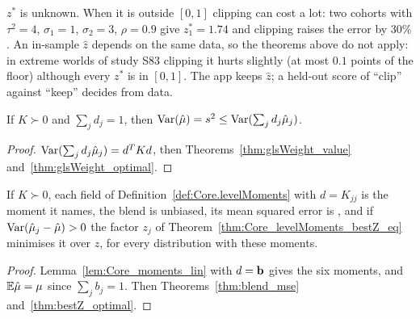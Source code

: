\begin{remark}
  $z^*$ is unknown. When it is outside $[0, 1]$ clipping can cost a lot: two cohorts with $\tau^2 = 4$,
  $\sigma_1 = 1$, $\sigma_2 = 3$, $\rho = 0.9$ give $z_1^* = 1.74$ and clipping raises the error by $30\%$. An in-sample
  $\hat z$ depends on the same data, so the theorems above do not apply: in extreme worlds of study S83 clipping it
  hurts slightly (at most $0.1$ points of the floor) although every $z^*$ is in $[0, 1]$. The app keeps $\hat z$; a
  held-out score of ``clip'' against ``keep'' decides from data.
\end{remark}

\begin{theorem}\label{thm:Core_weights_true}
  \leanok
  If $K \succ 0$ and $\sum_j d_j = 1$, then
  $\operatorname{Var}(\hat\mu) = s^2 \le \operatorname{Var}(\sum_j d_j\hat\mu_j)$.
\end{theorem}
\begin{proof}
  \leanok
  $\operatorname{Var}(\sum_j d_j\hat\mu_j) = d^TKd$, then
  Theorems~\ref{thm:glsWeight_value} and~\ref{thm:glsWeight_optimal}.
\end{proof}

\begin{theorem}\label{thm:Core_bestZ_mse}
  \leanok
  If $K \succ 0$, each field of Definition~\ref{def:Core.levelMoments} with
  $d = K_{jj}$ is the moment it names, the blend is unbiased, its mean squared
  error is , and if $\operatorname{Var}(\hat\mu_j - \hat\mu) > 0$ the factor $z_j$ of
  Theorem~\ref{thm:Core_levelMoments_bestZ_eq} minimises it over $z$, for
  every distribution with these moments.
\end{theorem}
\begin{proof}
  \leanok
  Lemma~\ref{lem:Core_moments_lin} with $d = \mathbf{b}$ gives the six moments, and
  $\mathbb E\hat\mu = \mu$ since $\sum_j b_j = 1$. Then
  Theorems~\ref{thm:blend_mse} and~\ref{thm:bestZ_optimal}.
\end{proof}

